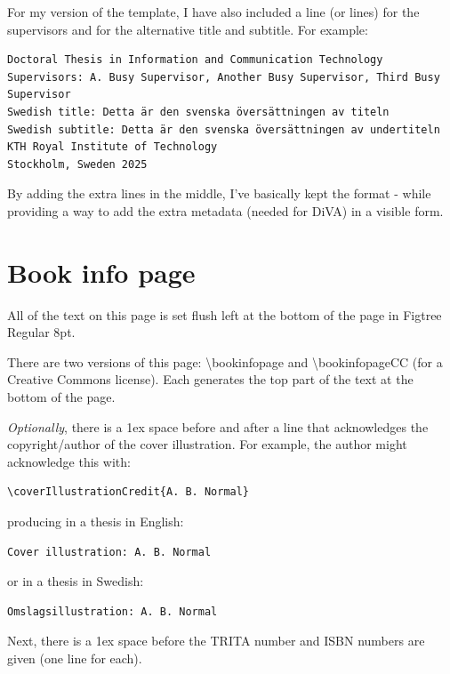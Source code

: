 \documentclass[12pt, twoside]{article}
\begin{document}
For my version of the template, I have also included a line (or lines) for the supervisors and for the alternative title and subtitle. 
For example:
\begin{lstlisting}
Doctoral Thesis in Information and Communication Technology
Supervisors: A. Busy Supervisor, Another Busy Supervisor, Third Busy Supervisor
Swedish title: Detta är den svenska översättningen av titeln
Swedish subtitle: Detta är den svenska översättningen av undertiteln
KTH Royal Institute of Technology
Stockholm, Sweden 2025
\end{lstlisting}

By adding the extra lines in the middle, I've basically kept the format - while providing a way to add the extra metadata (needed for \gls{DiVA}) in a visible form.

\section{Book info page}
\label{sec:cycle3BookinfoPage}

All of the text on this page is set flush left at the bottom of the page in Figtree Regular 8pt.

There are two versions of this page: \textbackslash bookinfopage and \textbackslash bookinfopageCC (for a Creative Commons license). Each generates the top part of the text at the bottom of the page.

\textit{Optionally}, there is a 1ex space before and after a line that acknowledges the copyright/author of the cover illustration. For example, the author might acknowledge this with:
\begin{lstlisting}[style=latexExampleForAuthors]
\coverIllustrationCredit{A. B. Normal}
\end{lstlisting}
producing in a thesis in English:
\begin{verbatim}
Cover illustration: A. B. Normal
\end{verbatim}
or in a thesis in Swedish:
\begin{verbatim}
Omslagsillustration: A. B. Normal
\end{verbatim}

Next, there is a 1ex space before the TRITA number and ISBN numbers are given (one line for each).
\end{document}
